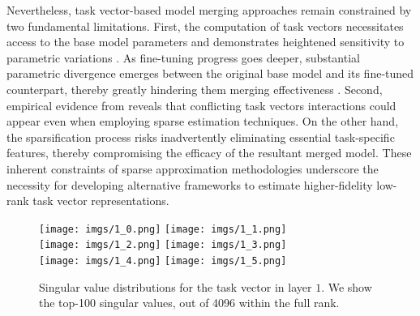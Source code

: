 Nevertheless, task vector-based model merging approaches remain constrained by two fundamental limitations. First, the computation of task vectors necessitates access to the base model parameters and demonstrates heightened sensitivity to parametric variations \citep{yu_2024_language}. As fine-tuning progress goes deeper, substantial parametric divergence emerges between the original base model and its fine-tuned counterpart, thereby greatly hindering them merging effectiveness \citep{yu2024extend}.
Second, empirical evidence from \citet{yadav_2024_ties} reveals that conflicting task vectors interactions could appear even when employing sparse estimation techniques. On the other hand, the sparsification process risks inadvertently eliminating essential task-specific features, thereby compromising the efficacy of the resultant merged model. These inherent constraints of sparse approximation methodologies underscore the necessity for developing alternative frameworks to estimate higher-fidelity low-rank task vector representations.


\begin{figure}[t!]
\centering
\texttt{[image: imgs/1\_0.png]}
\texttt{[image: imgs/1\_1.png]} \\
\texttt{[image: imgs/1\_2.png]} 
\texttt{[image: imgs/1\_3.png]} \\
\texttt{[image: imgs/1\_4.png]} 
\texttt{[image: imgs/1\_5.png]}
\caption{Singular value distributions for the task vector in layer $1$. We show the top-100 singular values, out of 4096 within the full rank.}
\label{fig:1}
\end{figure}

